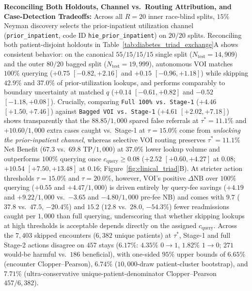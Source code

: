 \documentclass[11pt]{article}
\theoremstyle{remark}
\begin{document}
\textbf{Reconciling Both Holdouts, Channel vs.\ Routing Attribution, and Case-Detection Tradeoffs:} Across all $R = 20$ inner race-blind splits, $15\%$ Neyman discovery selects the prior-inpatient utilization channel (\texttt{prior\_inpatient}, code ID \texttt{hie\_prior\_inpatient}) on $20/20$ splits. Reconciling both patient-disjoint holdouts in Table~\ref{tab:diabetes_triad_exchange}A shows consistent behavior: on the canonical $55/15/15/15$ single split ($N_{\text{test}} = 14{,}909$) and the outer $80/20$ bagged split ($N_{\text{test}} = 19{,}999$), autonomous VOI matches $100\%$ querying ($+0.75$ $[-0.82, +2.16]$ and $+0.15$ $[-0.96, +1.18]$) while skipping $42.9\%$ and $37.0\%$ of prior-utilization lookups, and performs comparably to boundary uncertainty at matched $q$ ($+0.14$ $[-0.61, +0.82]$ and $-0.52$ $[-1.18, +0.08]$). Crucially, comparing \texttt{Full 100\% vs.\ Stage-1} ($+4.46$ $[+1.50, +7.46]$) against \texttt{Bagged VOI vs.\ Stage-1} ($+4.61$ $[+2.02, +7.18]$) shows transparently that the $88.85/1{,}000$ spared false referrals at $\tau^*=11.1\%$ and $+10.60/1{,}000$ extra cases caught vs.\ Stage-1 at $\tau=15.0\%$ come from \emph{unlocking the prior-inpatient channel}, whereas selective VOI routing preserves $\tau^*=11.1\%$ Net Benefit ($67.3$ vs.\ $69.8$ TP/$1{,}000$) at $37.0\%$ lower lookup volume and outperforms $100\%$ querying once $c_{\text{query}} \ge 0.08$ ($+2.52$ $[+0.60, +4.27]$ at $0.08$; $+10.54$ $[+7.50, +13.48]$ at $0.16$; Figure~\ref{fig:clinical_triad}B). At stricter action thresholds $\tau = 15.0\%$ and $\tau = 20.0\%$, however, VOI's positive $\Delta\text{NB}$ over $100\%$ querying ($+0.55$ and $+4.47/1{,}000$) is driven entirely by query-fee savings ($+4.19$ and $+9.22/1{,}000$ vs.\ $-3.65$ and $-4.80/1{,}000$ pre-fee NB) and comes with $9.7$ ($37.8$ vs.\ $47.5$, $-20.4\%$) and $15.2$ ($12.8$ vs.\ $28.0$, $-54.3\%$) fewer readmissions caught per $1{,}000$ than full querying, underscoring that whether skipping lookups at high thresholds is acceptable depends directly on the assigned $c_{\text{query}}$. Across the $7{,}403$ skipped encounters ($6{,}382$ unique patients) at $\tau^*$, Stage-1 and full Stage-2 actions disagree on $457$ stays ($6.17\%$: $4.35\%$ $0 \to 1$, $1.82\%$ $1 \to 0$; $271$ would-be harmful vs.\ $186$ beneficial), with one-sided $95\%$ upper bounds of \textbf{$6.65\%$} (encounter Clopper--Pearson), \textbf{$6.74\%$} ($10{,}000$-draw patient-cluster bootstrap), and \textbf{$7.71\%$} (ultra-conservative unique-patient-denominator Clopper--Pearson $457 / 6{,}382$).
\end{document}
